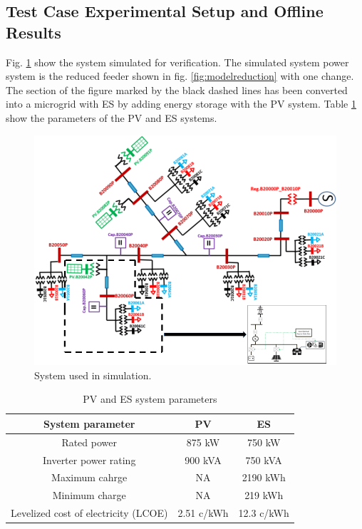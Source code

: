 \subsection{Test Case Experimental Setup and Offline Results}
Fig. \ref{fig:simulation_grid} show the system simulated for verification. The simulated system power system is the reduced feeder shown in fig. \ref{fig:modelreduction} with one change. The section of the figure marked by the black dashed lines has been converted into a microgrid with ES by adding energy storage with the PV system. Table \ref{tab:SYSTEM} show the parameters of the PV and ES systems.
\begin{figure}[!ht]
    \centering
    \includegraphics[width = 0.8\linewidth]{figs/simulation_grid.png}
    \caption{System used in simulation.}
    \label{fig:simulation_grid}
\end{figure}



\begin{table}[htb]
\caption{PV and ES system parameters}
\label{tab:SYSTEM}
\centering
\begin{tabular}{|c|c|c|}
\hline
\textbf{System parameter}            & \textbf{PV} & \textbf{ES} \\ \hline
Rated power                          & 875 kW      & 750 kW      \\ \hline
Inverter power rating                & 900 kVA     & 750 kVA     \\ \hline
Maximum cahrge                       & NA          & 2190 kWh    \\ \hline
Minimum charge                       & NA          & 219 kWh     \\ \hline
Levelized cost of electricity (LCOE) & 2.51 c/kWh  & 12.3 c/kWh  \\ \hline
\end{tabular}
\end{table}


